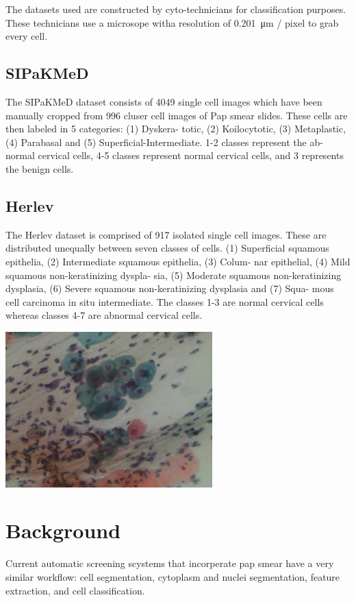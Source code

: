 \documentclass[ms,electronic,oneside,twosidetoc,letterpaper,chaptercenter,parttop]{byumsphd}
\begin{document}
The datasets used are constructed by cyto-technicians for classification purposes. These technicians use a microsope witha resolution of  \SI{0.201}{\micro\metre} / pixel to grab every cell.


\section{SIPaKMeD}
The SIPaKMeD dataset consists of 4049 single cell images which have been manually cropped
from 996 cluser cell images of Pap smear slides. These cells are then labeled in 5 categories: (1) Dyskera- totic, (2) Koilocytotic, (3) Metaplastic, (4) Parabasal and (5) Superficial-Intermediate. 1-2 classes represent the ab- normal cervical cells, 4-5 classes represent normal cervical cells, and 3 represents the benign cells.\cite{sipakmed}

\section{Herlev}
The Herlev dataset is comprised of 917 isolated single cell images. These are distributed unequally between seven classes of cells.  (1) Superficial squamous epithelia, (2) Intermediate squamous epithelia, (3) Colum- nar epithelial, (4) Mild squamous non-keratinizing dyspla- sia, (5) Moderate squamous non-keratinizing dysplasia, (6) Severe squamous non-keratinizing dysplasia and (7) Squa-
mous cell carcinoma in situ intermediate. The classes 1-3 are normal cervical cells whereas classes 4-7 are abnormal cervical cells.\cite{herlev}

\includegraphics[width=8cm]{test}


\chapter{Background}

Current automatic screening scystems that incorperate pap smear have a very similar workflow: cell segmentation, cytoplasm and nuclei segmentation, feature extraction, and cell classification.
\end{document}
